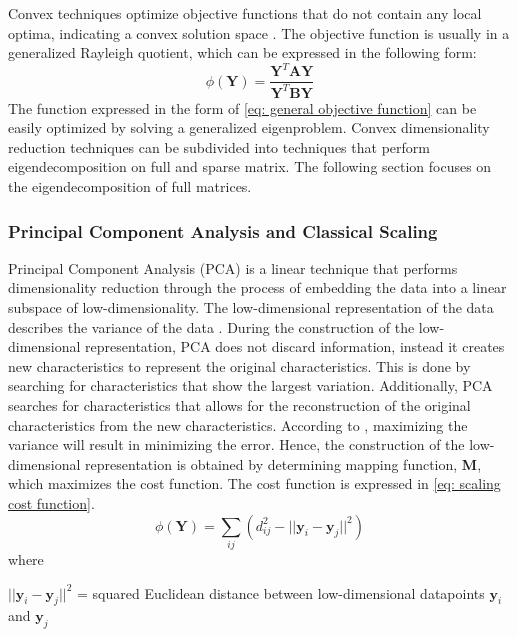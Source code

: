 \documentclass[11pt]{article}
\begin{document}
	Convex techniques optimize objective functions that do not contain any local optima, indicating a convex solution space \cite{Boyd2010}. The objective function is usually in a generalized Rayleigh quotient, which can be expressed in the following form: 
	\begin{equation}
	\phi(\textbf{Y}) = \frac{\textbf{Y}^{T}\textbf{AY}}{\textbf{Y}^{T}\textbf{BY}}
	\label{eq: general objective function}
	\end{equation}
	The function expressed in the form of \eqref{eq: general objective function} can be easily optimized by solving a generalized eigenproblem. Convex dimensionality reduction techniques can be subdivided into techniques that perform eigendecomposition on full and sparse matrix. The following section focuses on the eigendecomposition of full matrices. 
	
	\subsubsection{Principal Component Analysis and Classical Scaling}
	Principal Component Analysis (PCA) is a linear technique that performs dimensionality reduction through the process of embedding the data into a linear subspace of low-dimensionality. The low-dimensional representation of the data describes the variance of the data \cite{Jolliffe2016}. During the construction of the low-dimensional representation, PCA does not discard information, instead it creates new characteristics to represent the original characteristics. This is done by searching for characteristics that show the largest variation. Additionally, PCA searches for characteristics that allows for the reconstruction of the original characteristics from the new characteristics. According to \cite{van2009dimensionality}, maximizing the variance will result in minimizing the error. Hence, the construction of the low-dimensional representation is obtained by determining mapping function,  \textbf{M}, which maximizes the cost function. The cost function is expressed in \eqref{eq: scaling cost function}.
	\begin{equation}
	\phi(\textbf{Y}) = \sum_{ij}(d_{ij}^{2} - ||\textbf{y}_i - \textbf{y}_j||^2)
	\label{eq: scaling cost function}
	\end{equation}
	where 
	
	$||\textbf{y}_i - \textbf{y}_j ||^{2}$ = squared Euclidean distance between low-dimensional datapoints $\textbf{y}_i$ and $\textbf{y}_j$
	
\end{document}
